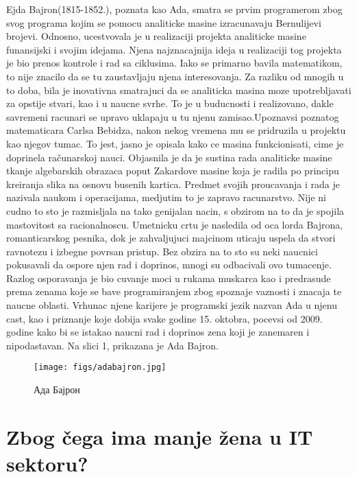 \documentclass[a4paper,12pt]{article}
\begin{document}
\begin{flushleft}
    Ejda Bajron(1815-1852.), poznata kao Ada, smatra se prvim programerom zbog svog programa kojim se pomocu analiticke masine izracunavaju Bernulijevi brojevi. Odnosno, ucestvovala je u realizaciji projekta analiticke masine funansijski i svojim idejama. Njena najznacajnija ideja u realizaciji tog projekta je bio prenos kontrole i rad sa ciklusima. Iako se primarno bavila matematikom, to nije znacilo da se tu zaustavljaju njena interesovanja. Za razliku od mnogih u to doba, bila je inovativna smatrajuci da se analiticka masina moze upotrebljavati za opstije stvari, kao i u naucne svrhe. To je u buducnosti i realizovano, dakle savremeni racunari se upravo uklapaju u tu njenu zamisao.Upoznavsi poznatog matematicara Carlsa Bebidza, nakon nekog vremena mu se pridruzila u projektu kao njegov tumac. To jest, jasno je opisala kako ce masina funkcionisati, cime je doprinela računarskoj nauci. Objasnila je da je sustina rada analiticke masine tkanje algebarskih obrazaca poput Zakardove masine koja je radila po principu kreiranja slika na osnovu busenih kartica. Predmet svojih proucavanja i rada je nazivala naukom i operacijama, medjutim to je zapravo racunarstvo. Nije ni cudno to sto je razmisljala na tako genijalan nacin, s obzirom na to da je spojila mastovitost sa racionalnoscu. Umetnicku crtu je nasledila od oca lorda Bajrona, romanticarskog pesnika, dok je zahvaljujuci majcinom uticaju uspela da stvori ravnotezu i izbegne povrsan pristup. Bez obzira na to sto su neki naucnici pokusavali da ospore njen rad i doprinos, mnogi su odbacivali ovo tumacenje. Razlog osporavanja je bio cuvanje moci u rukama muskarca kao i predrasude prema zenama koje se bave programiranjem zbog spoznaje vaznosti i znacaja te naucne oblasti. Vrhunac njene karijere je programski jezik nazvan Ada u njenu cast, kao i priznanje koje dobija svake godine 15. oktobra, pocevsi od 2009. godine kako bi se istakao naucni rad i doprinos zena koji je zanemaren i nipodastavan. Na slici 1, prikazana je Ada Bajron.
\end{flushleft}

\begin{figure}
    \centering
    \texttt{[image: figs/adabajron.jpg]}
    \caption{Ада Бајрон}
    \label{fig:my_label}
\end{figure}


\section{Zbog čega ima manje žena u IT sektoru?}
\end{document}
